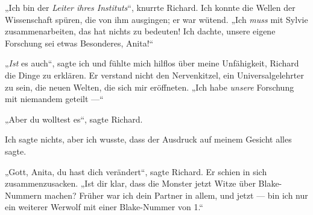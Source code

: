 „Ich bin der \emph{Leiter ihres Instituts}“, knurrte Richard. Ich konnte die Wellen der Wissenschaft spüren, die von ihm ausgingen; er war wütend.
„Ich \emph{muss} mit Sylvie zusammenarbeiten, das hat nichts zu bedeuten! Ich dachte, unsere eigene Forschung sei etwas Besonderes, Anita!“

„\emph{Ist} es auch“, sagte ich und fühlte mich hilflos über meine Unfähigkeit, Richard die Dinge zu erklären. Er verstand nicht den Nervenkitzel, ein Universalgelehrter zu sein, die neuen Welten, die sich mir eröffneten.
„Ich habe \emph{unsere} Forschung mit niemandem geteilt —“

„Aber du wolltest es“, sagte Richard.

Ich sagte nichts, aber ich wusste, dass der Ausdruck auf meinem Gesicht alles sagte.

„Gott, Anita, du hast dich verändert“, sagte Richard. Er schien in sich zusammenzusacken.
„Ist dir klar, dass die Monster jetzt Witze über Blake-Nummern machen? Früher war ich dein Partner in allem, und jetzt — bin ich nur ein weiterer Werwolf mit einer Blake-Nummer von 1.“

